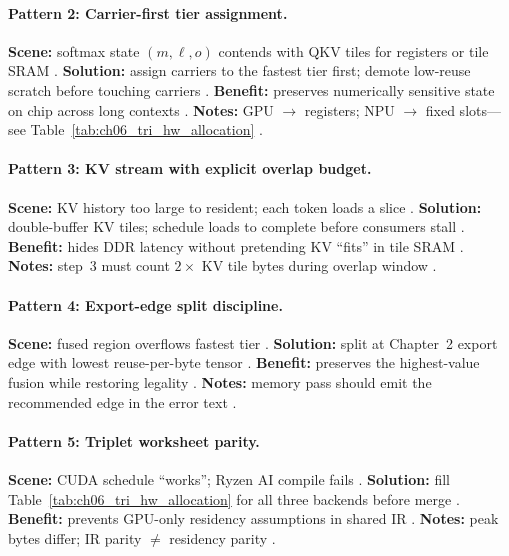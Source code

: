 \paragraph{Pattern 2: Carrier-first tier assignment.}
\textbf{Scene:} softmax state $(m,\ell,o)$ contends with QKV tiles for registers or tile SRAM \citep{dao2022flashattention}.
\textbf{Solution:} assign carriers to the fastest tier first; demote low-reuse scratch before touching carriers \citep{dao2022flashattention,patel2025llminference}.
\textbf{Benefit:} preserves numerically sensitive state on chip across long contexts \citep{dao2023flashdecoding}.
\textbf{Notes:} GPU $\rightarrow$ registers; NPU $\rightarrow$ fixed slots---see Table~\ref{tab:ch06_tri_hw_allocation} \citep{amd2024aie,nvidia2022hopper}.

\paragraph{Pattern 3: KV stream with explicit overlap budget.}
\textbf{Scene:} KV history too large to resident; each token loads a slice \citep{kwon2023vllm,dao2023flashdecoding}.
\textbf{Solution:} double-buffer KV tiles; schedule loads to complete before consumers stall \citep{semianalysis2024tma,amd2024xdna}.
\textbf{Benefit:} hides DDR latency without pretending KV ``fits'' in tile SRAM \citep{patel2025llminference,memoryfloor2026}.
\textbf{Notes:} step~3 must count $2\times$ KV tile bytes during overlap window \citep{yirage2026,dao2022flashattention}.

\paragraph{Pattern 4: Export-edge split discipline.}
\textbf{Scene:} fused region overflows fastest tier \citep{memoryfloor2026,yirage2026}.
\textbf{Solution:} split at Chapter~2 export edge with lowest reuse-per-byte tensor \citep{chen2020compilerbasedhardw,taxbreak2026}.
\textbf{Benefit:} preserves the highest-value fusion while restoring legality \citep{wu2024mirage,mpk2025}.
\textbf{Notes:} memory pass should emit the recommended edge in the error text \citep{yirage2026}.

\paragraph{Pattern 5: Triplet worksheet parity.}
\textbf{Scene:} CUDA schedule ``works''; Ryzen AI compile fails \citep{amd2024xdna,taxbreak2026}.
\textbf{Solution:} fill Table~\ref{tab:ch06_tri_hw_allocation} for all three backends before merge \citep{yirage2026,chen2020compilerbasedhardw}.
\textbf{Benefit:} prevents GPU-only residency assumptions in shared IR \citep{patel2025llminference,memoryfloor2026}.
\textbf{Notes:} peak bytes differ; IR parity $\neq$ residency parity \citep{amd2024aie,nvidia2022hopper}.

